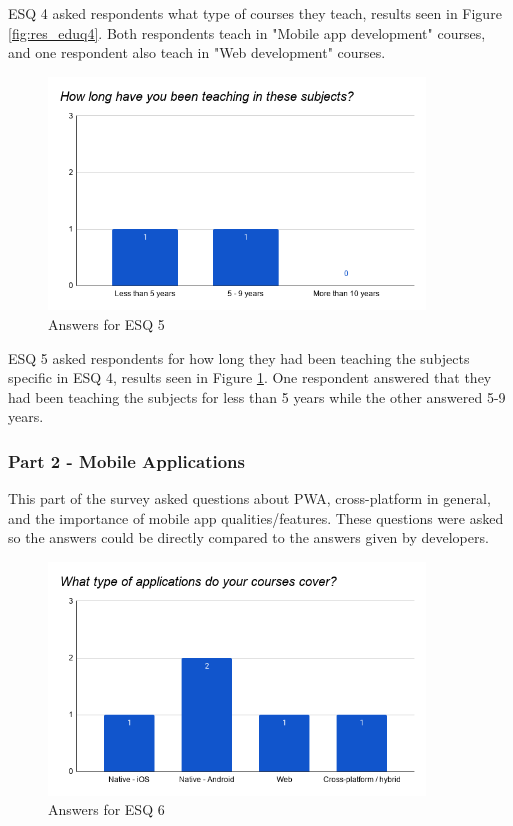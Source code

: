 \documentclass[a4paper,12pt]{article}
\begin{document}
ESQ 4 asked respondents what type of courses they teach, results seen in Figure \ref{fig:res_eduq4}. Both respondents teach in "Mobile app development" courses, and one respondent also teach in "Web development" courses.

\begin{figure}[ht!]
    \centering
    \includegraphics[width=10cm]{img/Results/esq5.png}
    \caption{Answers for ESQ 5}
    \label{fig:res_eduq5}
\end{figure}

ESQ 5 asked respondents for how long they had been teaching the subjects specific in ESQ 4, results seen in Figure \ref{fig:res_eduq5}. One respondent answered that they had been teaching the subjects for less than 5 years while the other answered 5-9 years.

\subsubsection{Part 2 - Mobile Applications}
\label{Results_edu_part2}
This part of the survey asked questions about PWA, cross-platform in general, and the importance of mobile app qualities/features. These questions were asked so the answers could be directly compared to the answers given by developers.

\begin{figure}[ht!]
    \centering
    \includegraphics[width=10cm]{img/Results/esq6.png}
    \caption{Answers for ESQ 6}
    \label{fig:res_eduq6}
\end{figure}
\end{document}
